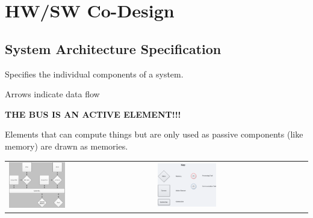 \section{HW/SW Co-Design }
	\subsection{System Architecture Specification}
	
		\begin{compactitem}
		  \item Specifies the individual components of a system.
		  \item Arrows indicate data flow
		  \item {\color{red}\textbf{THE BUS IS AN ACTIVE ELEMENT!!!}}
		  \item Elements that can compute things but are only used as passive components (like memory) are drawn as memories.
		\end{compactitem}
		
		\begin{tabular}{p{}p{}}
			\includegraphics[width=0.4\textwidth]{./pictures/systemArchDiagram.png}
			&
			\includegraphics[width=0.4\textwidth]{./pictures/systemArchKey.png}\\
		\end{tabular}	


